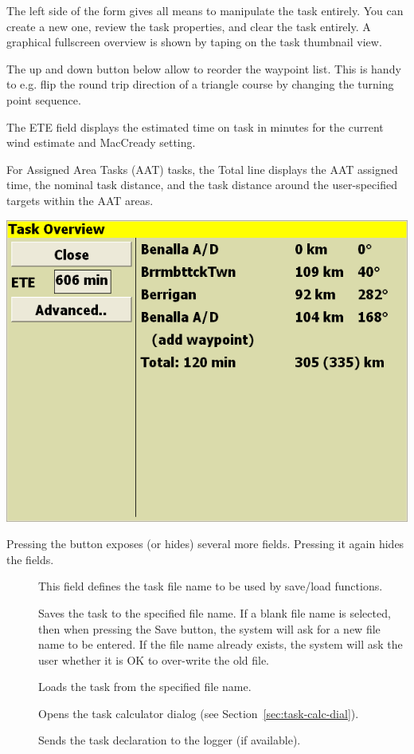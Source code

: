 \documentclass[a4paper,12pt]{refrep}
\begin{document}
The left side of the form gives all means to manipulate the task entirely. You
can create a new one, review the task properties, and clear the task entirely. A
graphical fullscreen overview is shown by taping on the task thumbnail view.

The up and down button below allow to reorder the waypoint list. This is handy
to e.g. flip the round trip direction of a triangle course by changing the
turning point sequence.



The ETE field displays the estimated time on task in minutes for the
current wind estimate and MacCready setting.

For Assigned Area Tasks (AAT) tasks, the Total line displays the AAT
assigned time, the nominal task distance, and the task distance around
the user-specified targets within the AAT areas.

\begin{center}
\includegraphics[angle=0,width=\linewidth,keepaspectratio='true']{figures/dialog-taskedit1.png}
\end{center}

Pressing the  button exposes (or hides) several more
fields.  Pressing it again hides the fields.
\begin{description}
\item[] This field defines the task file name to be used by save/load functions.  
\item[] Saves the task to the specified file name.  If a blank file name is selected, then when pressing the Save button, the system will ask for a new file name to be entered.  If the file name already exists, the system will ask the user whether it is OK to over-write the old file.
\item[] Loads the task from the specified file name.
\item[] Opens the task calculator dialog (see Section~\ref{sec:task-calc-dial}).
\item[] Sends the task declaration to the logger (if available).
\end{description} 
\end{document}
